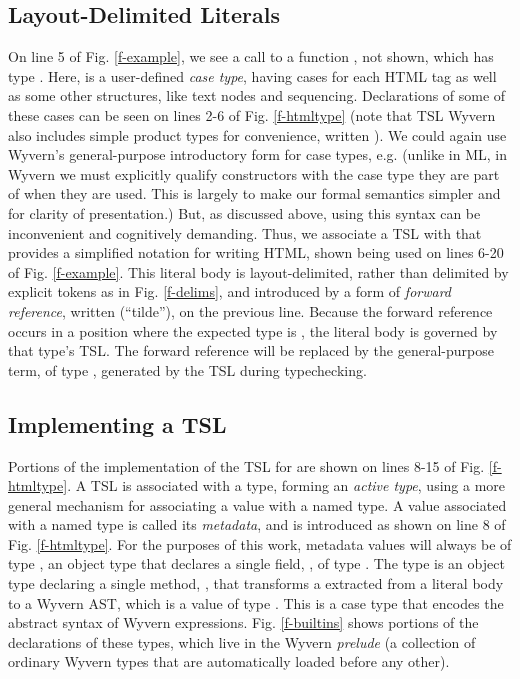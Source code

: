 \subsection{Layout-Delimited Literals}
On line 5 of Fig. \ref{f-example}, we see a call to a function , not shown, which has type . Here,  is a user-defined \emph{case type}, having cases for each HTML tag as well as some other structures, like text nodes and sequencing. Declarations  of some of these cases can be seen on lines 2-6 of Fig. \ref{f-htmltype} (note that TSL Wyvern also includes simple product types for convenience, written ). We could again use Wyvern's general-purpose introductory form for case types, e.g.  ({unlike in ML, in Wyvern we must explicitly qualify constructors with the case type they are part of when they are used}. This is largely to make our formal semantics simpler and for clarity of presentation.) But, as discussed above, using this syntax can be inconvenient and  cognitively demanding. Thus, we associate a TSL with  that provides a simplified notation for writing HTML, shown being used on lines 6-20 of Fig. \ref{f-example}. This literal body is layout-delimited, rather than delimited by explicit tokens as in Fig. \ref{f-delims}, and introduced by a form of \emph{forward reference}, written \li{~} (``tilde''), on the previous line. Because the forward reference occurs in a position where the expected type is , the literal body is governed by that type's TSL. The forward reference will be replaced by the general-purpose term, of type , generated by the TSL during typechecking.
\subsection{Implementing a TSL}
Portions of the implementation of the TSL for  are shown on lines 8-15 of Fig. \ref{f-htmltype}. A TSL is associated with a type, forming an \emph{active type}, using a more general mechanism for associating a value with a named type. A value associated with a named type is called its \emph{metadata}, and is introduced as shown on line 8 of Fig. \ref{f-htmltype}. For the purposes of this work, metadata values will always be of type , an object type that declares a single field, , of type . The  type is an object type declaring a single method, , that transforms a  extracted from a literal body to a Wyvern AST, which is a value of type . This is a case type that encodes the abstract syntax of Wyvern expressions. Fig. \ref{f-builtins} shows portions of the declarations of these types, which live in the Wyvern \emph{prelude} (a collection of ordinary Wyvern types that are automatically loaded before any other).

